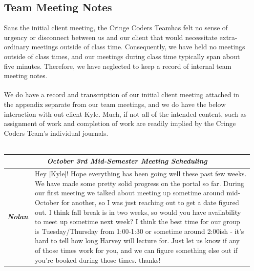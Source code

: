 \documentclass[oneside,openany,obeyspaces]{book}
\newcommand\tab[1][1cm]{\hspace*{#1}}
\newcommand\TeamName{Cringe Coders Team}
\begin{document}
\begin{flushleft}
    \section{Team Meeting Notes}

    \tab Sans the initial client meeting, the \TeamName\space has felt no sense of urgency or disconnect between us and our client that would necessitate extra-ordinary meetings outside of class time. Consequently, we have held no meetings outside of class times, and our meetings during class time typically span about five minutes. Therefore, we have neglected to keep a record of internal team meeting notes.\\~\\
    \tab We do have a record and transcription of our initial client meeting attached in the appendix separate from our team meetings, and we do have the below interaction with out client Kyle. Much, if not all of the intended content, such as assignment of work and completion of work are readily implied by the \TeamName's individual journals.\\~\\
    \begin{center}
        \def\arraystretch{2.5}
        \begin{longtable}{ p{1.5cm} p{13.5cm} }
            \multicolumn{2}{c}{\large\textit{October 3rd Mid-Semester Meeting Scheduling}}                                                                                                                                                                                                                                                                                                                                                                                                                                                                                                                                                                                                                                    \\ \hline
            \textbf{\textit{Nolan}} & Hey [Kyle]! Hope everything has been going well these past few weeks. We have made some pretty solid progress on the portal so far. During our first meeting we talked about meeting up sometime around mid-October for another, so I was just reaching out to get a date figured out. I think fall break is in two weeks, so would you have availability to meet up sometime next week? I think the best time for our group is Tuesday/Thursday from 1:00-1:30 or sometime around 2:00ish - it's hard to tell how long Harvey will lecture for. Just let us know if any of those times work for you, and we can figure something else out if you're booked during those times. thanks! \\


\end{longtable}
\end{center}
\end{flushleft}
\end{document}
